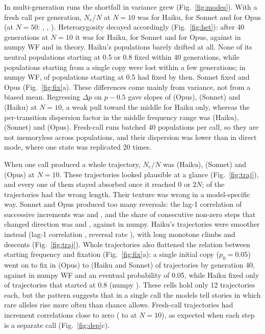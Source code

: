 \documentclass[11pt,a4paper]{article}
\newcommand{\Ne}{N_e}
\begin{document}
In multi-generation runs the shortfall in variance grew (Fig.~\ref{fig:modes}).
With a fresh call per generation, $\Ne/N$ at $N=10$ was \MlNeHaikuTen{} for Haiku, \MlNeSonnetTen{} for Sonnet and \MlNeOpusTen{} for Opus (at $N=50$: \MlNeHaikuFifty, \MlNeSonnetFifty, \MlNeOpusFifty).
Heterozygosity decayed accordingly (Fig.~\ref{fig:het}): after 40 generations at $N=10$ it was \MlHendHaikuTen{} for Haiku, \MlHendSonnetTen{} for Sonnet and \MlHendOpusTen{} for Opus, against \npHendTen{} in numpy WF and in theory.
Haiku's populations barely drifted at all.
None of its neutral populations starting at 0.5 or 0.8 fixed within 40 generations, while populations starting from a single copy were lost within a few generations; in numpy WF, \npFixHalfNeu{} of populations starting at 0.5 had fixed by then.
Sonnet fixed \MlFixSonnetHalfNeu{} and Opus \MlFixOpusHalfNeu{} (Fig.~\ref{fig:fix}a).
These differences come mainly from variance, not from a biased mean.
Regressing $\Delta p$ on $p-0.5$ gave slopes of \MlPullOpusTen{} (Opus), \MlPullSonnetTen{} (Sonnet) and \MlPullHaikuTen{} (Haiku) at $N=10$, a weak pull toward the middle for Haiku only, whereas the per-transition dispersion factor in the middle frequency range was \MlPhiMidHaiku{} (Haiku), \MlPhiMidSonnet{} (Sonnet) and \MlPhiMidOpus{} (Opus).
Fresh-call runs batched 40 populations per call, so they are not memoryless across populations, and their dispersion was lower than in direct mode, where one state was replicated 20 times.

When one call produced a whole trajectory, $\Ne/N$ was \WhNeHaikuTen{} (Haiku), \WhNeSonnetTen{} (Sonnet) and \WhNeOpusTen{} (Opus) at $N=10$.
These trajectories looked plausible at a glance (Fig.~\ref{fig:traj}), and every one of them stayed absorbed once it reached 0 or $2N$; \whBadLength{} of the \nWhTraj{} trajectories had the wrong length.
Their texture was wrong in a model-specific way.
Sonnet and Opus produced too many reversals: the lag-1 correlation of successive increments was \WhLagSonnetTen{} and \WhLagOpusTen, and the share of consecutive non-zero steps that changed direction was \WhRevSonnetTen{} and \WhRevOpusTen{}, against \npRevTen{} in numpy.
Haiku's trajectories were smoother instead (lag-1 correlation \WhLagHaikuTen, reversal rate \WhRevHaikuTen), with long monotone climbs and descents (Fig.~\ref{fig:traj}).
Whole trajectories also flattened the relation between starting frequency and fixation (Fig.~\ref{fig:fix}a): a single initial copy ($p_0=0.05$) went on to fix in \WhFixOpusFiveNeu{} (Opus) to \WhFixHaikuFiveNeu{} (Haiku and Sonnet) of trajectories by generation 40, against \npFixFiveNeu{} in numpy WF and an eventual probability of 0.05, while Haiku fixed only \WhFixHaikuEightyNeu{} of trajectories that started at 0.8 (numpy \npFixEightyNeu). These cells hold only 12 trajectories each, but the pattern suggests that in a single call the models tell stories in which rare alleles rise more often than chance allows.
Fresh-call trajectories had increment correlations close to zero (\MlLagOpusTen{} to \MlLagSonnetTen{} at $N=10$), as expected when each step is a separate call (Fig.~\ref{fig:dep}c).
\end{document}
